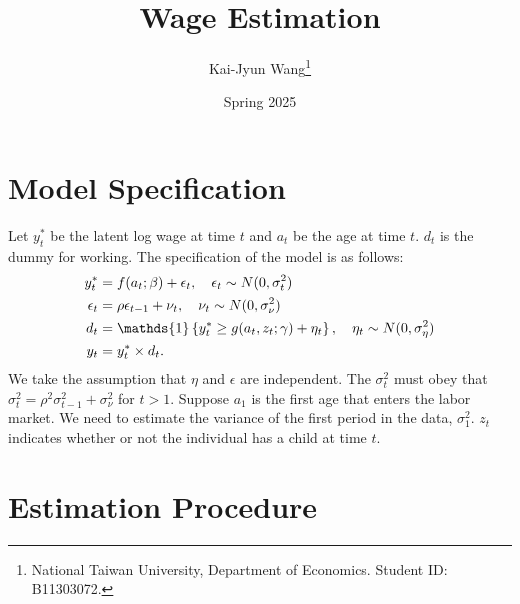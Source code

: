 \documentclass[a4paper, 12pt]{article}
\title{Wage Estimation}
\author{Kai-Jyun Wang\thanks{National Taiwan University, Department of Economics. Student ID: B11303072.}}
\date{Spring 2025}
\begin{document}
\maketitle

\section{Model Specification}
Let $y^*_t$ be the latent log wage at time $t$ and $a_t$ be the age at time $t$. $d_t$ 
is the dummy for working. The specification of the model is as follows: 
\begin{align*}
    y^*_t &= f(a_t;\beta) + \epsilon_t, \quad \epsilon_t \sim N(0, \sigma_t^2) \\
    \epsilon_t &= \rho\epsilon_{t-1} + \nu_t, \quad \nu_t \sim N(0, \sigma_\nu^2) \\
    d_t &= \mathds{1}\brc{y_t^* \geq g(a_t,z_t;\gamma) + \eta_t}, \quad \eta_t \sim N(0, \sigma_\eta^2) \\ 
    y_t &= y^*_t \times d_t. 
\end{align*}
We take the assumption that $\eta$ and $\epsilon$ are independent. The $\sigma_t^2$ must 
obey that $\sigma_t^2 = \rho^2 \sigma_{t-1}^2 + \sigma_\nu^2$ for $t > 1$. 
Suppose $a_1$ is the first age that enters the labor market. We need to 
estimate the variance of the first period in the data, $\sigma_1^2$. $z_t$ indicates whether 
or not the individual has a child at time $t$.  

\section{Estimation Procedure}
\end{document}
